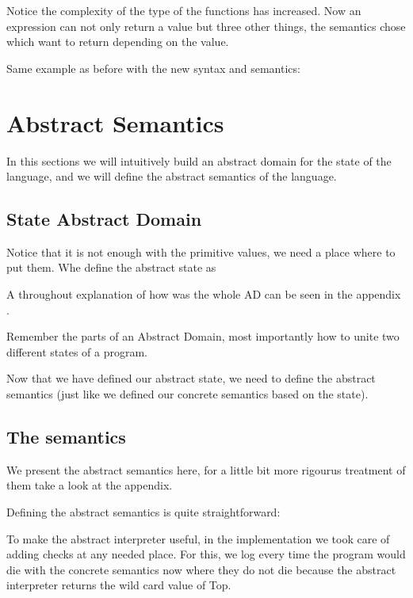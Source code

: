 Notice the complexity of the type of the functions has increased. Now an expression can
not only return a value but three other things, the semantics chose which want to return
depending on the value.

Same example as before with the new syntax and semantics:



\section{Abstract Semantics}

In this sections we will intuitively build an abstract domain for the state of the
language, and we will define the abstract semantics of the language.

\subsection{State Abstract Domain}


Notice that it is not enough with the primitive values, we need a place where to put them.
Whe define the abstract state as 

A throughout explanation of how was the whole AD can be seen in the appendix .

Remember the parts of an Abstract Domain, most importantly how to unite two different
states of a program.


Now that we have defined our abstract state, we need to define the abstract semantics
(just like we defined our concrete semantics based on the state).

\subsection{The semantics}

We present the abstract semantics here, for a little bit more rigourus treatment of them
take a look at the appendix.

Defining the abstract semantics is quite straightforward:



To make the abstract interpreter useful, in the implementation we took care of adding
checks at any needed place. For this, we log every time the program would die with the
concrete semantics now where they do not die because the abstract interpreter returns the
wild card value of Top.
